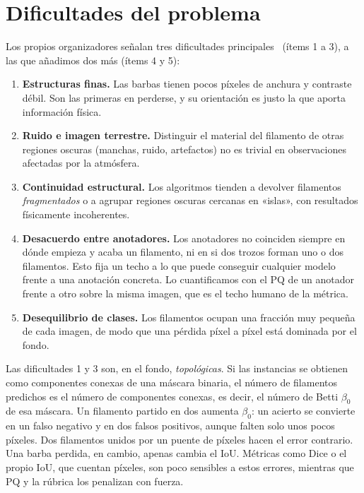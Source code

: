 \section{Dificultades del problema}
\label{sec:dificultades}

Los propios organizadores señalan tres dificultades
principales~\cite{kaggle2026} (ítems 1 a 3), a las que añadimos dos más
(ítems 4 y 5):

\begin{enumerate}
  \item \textbf{Estructuras finas.} Las barbas tienen pocos píxeles de
  anchura y contraste débil. Son las primeras en perderse, y su
  orientación es justo la que aporta información física.
  \item \textbf{Ruido e imagen terrestre.} Distinguir el material del
  filamento de otras regiones oscuras (manchas, ruido, artefactos) no es
  trivial en observaciones afectadas por la atmósfera.
  \item \textbf{Continuidad estructural.} Los algoritmos tienden a
  devolver filamentos \emph{fragmentados} o a agrupar regiones oscuras
  cercanas en «islas», con resultados físicamente incoherentes.
\item \textbf{Desacuerdo entre anotadores.} Los anotadores no coinciden
  siempre en dónde empieza y acaba un filamento, ni en si dos trozos
  forman uno o dos filamentos. Esto fija un techo a lo que puede conseguir
  cualquier modelo frente a una anotación concreta. Lo cuantificamos con
  el PQ de un anotador frente a otro sobre la misma imagen, que es el
  techo humano de la métrica.
  \item \textbf{Desequilibrio de clases.} Los filamentos ocupan una
  fracción muy pequeña de cada imagen, de modo que una pérdida píxel a
  píxel está dominada por el fondo.
\end{enumerate}

Las dificultades 1 y 3 son, en el fondo, \emph{topológicas}. Si las
instancias se obtienen como componentes conexas de una máscara binaria, el
número de filamentos predichos es el número de componentes conexas, es decir,
el número de Betti $\beta_0$ de esa máscara. Un filamento partido en dos
aumenta $\beta_0$: un acierto se convierte en un falso negativo y en dos falsos
positivos, aunque falten solo unos pocos píxeles. Dos filamentos unidos por un
puente de píxeles hacen el error contrario. Una barba perdida, en cambio, apenas
cambia el IoU. Métricas como Dice o el propio IoU, que cuentan píxeles, son
poco sensibles a estos errores, mientras que PQ y la rúbrica los penalizan con
fuerza.
